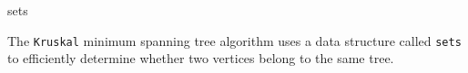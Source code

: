 \categorycontents{}

\begin{algorithm}{sets}

\desc
The {\tt Kruskal} minimum spanning tree algorithm uses a data structure
called {\tt sets} to efficiently determine whether two vertices belong to
the same tree.
\end{algorithm}


\begin{sourceslandscape}
\end{sourceslandscape}
